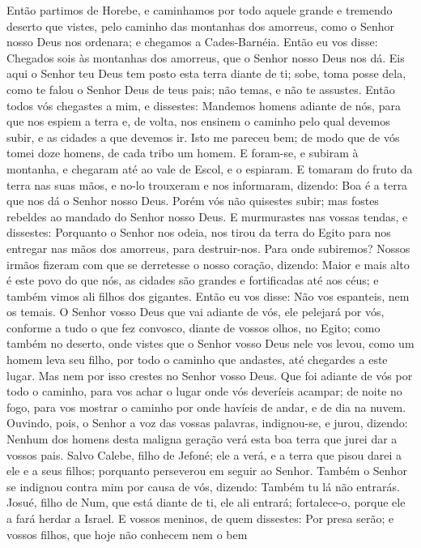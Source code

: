 Então partimos de Horebe, e caminhamos por todo aquele grande e
tremendo deserto que vistes, pelo caminho das montanhas dos
amorreus, como o Senhor nosso Deus nos ordenara; e chegamos a
Cades-Barnéia. Então eu vos disse: Chegados sois às montanhas
dos amorreus, que o Senhor nosso Deus nos dá. Eis aqui o
Senhor teu Deus tem posto esta terra diante de ti; sobe, toma posse
dela, como te falou o Senhor Deus de teus pais; não temas, e não te
assustes. Então todos vós chegastes a mim, e dissestes:
Mandemos homens adiante de nós, para que nos espiem a terra e, de
volta, nos ensinem o caminho pelo qual devemos subir, e as cidades a
que devemos ir. Isto me pareceu bem; de modo que de vós tomei
doze homens, de cada tribo um homem. E foram-se, e subiram à
montanha, e chegaram até ao vale de Escol, e o espiaram. E
tomaram do fruto da terra nas suas mãos, e no-lo trouxeram e nos
informaram, dizendo: Boa é a terra que nos dá o Senhor nosso Deus.
Porém vós não quisestes subir; mas fostes rebeldes ao mandado
do Senhor nosso Deus. E murmurastes nas vossas tendas, e
dissestes: Porquanto o Senhor nos odeia, nos tirou da terra do Egito
para nos entregar nas mãos dos amorreus, para destruir-nos.
Para onde subiremos? Nossos irmãos fizeram com que se
derretesse o nosso coração, dizendo: Maior e mais alto é este povo
do que nós, as cidades são grandes e fortificadas até aos céus; e
também vimos ali filhos dos gigantes. Então eu vos disse: Não
vos espanteis, nem os temais. O Senhor vosso Deus que vai
adiante de vós, ele pelejará por vós, conforme a tudo o que fez
convosco, diante de vossos olhos, no Egito; como também no
deserto, onde vistes que o Senhor vosso Deus nele vos levou, como um
homem leva seu filho, por todo o caminho que andastes, até chegardes
a este lugar. Mas nem por isso crestes no Senhor vosso Deus.
Que foi adiante de vós por todo o caminho, para vos achar o
lugar onde vós deveríeis acampar; de noite no fogo, para vos mostrar
o caminho por onde havíeis de andar, e de dia na nuvem.
Ouvindo, pois, o Senhor a voz das vossas palavras,
indignou-se, e jurou, dizendo: Nenhum dos homens desta
maligna geração verá esta boa terra que jurei dar a vossos pais.
Salvo Calebe, filho de Jefoné; ele a verá, e a terra que
pisou darei a ele e a seus filhos; porquanto perseverou em seguir ao
Senhor. Também o Senhor se indignou contra mim por causa de
vós, dizendo: Também tu lá não entrarás. Josué, filho de Num,
que está diante de ti, ele ali entrará; fortalece-o, porque ele a
fará herdar a Israel. E vossos meninos, de quem dissestes:
Por presa serão; e vossos filhos, que hoje não conhecem nem o bem

